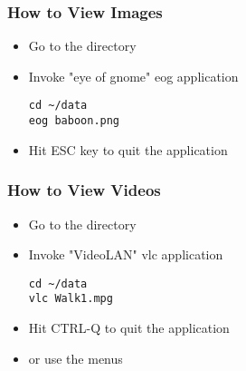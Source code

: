 \begin{frame}[fragile]
\frametitle{How to View Images}
\begin{itemize}
\item Go to the directory
\item Invoke "eye of gnome" eog application
\begin{verbatim}
cd ~/data
eog baboon.png
\end{verbatim}
\pause
\item Hit ESC key to quit the application
\end{itemize}
\end{frame}

\begin{frame}[fragile]
\frametitle{How to View Videos}
\begin{itemize}
\item Go to the directory
\item Invoke "VideoLAN" vlc application
\begin{verbatim}
cd ~/data
vlc Walk1.mpg
\end{verbatim}
\pause
\item Hit CTRL-Q to quit the application
\item or use the menus
\end{itemize}
\end{frame}
